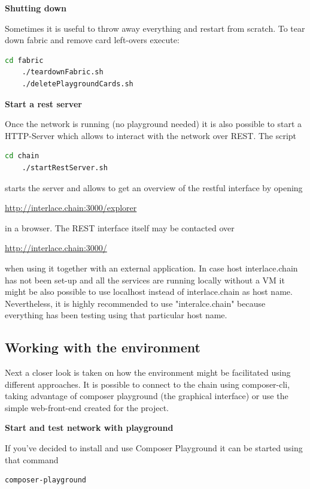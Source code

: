 \textbf{Shutting down}

Sometimes it is useful to throw away everything and restart from scratch. To tear down fabric and remove card left-overs execute:

\begin{lstlisting}[language=bash]
	cd fabric
	./teardownFabric.sh
	./deletePlaygroundCards.sh
\end{lstlisting}

\textbf{Start a rest server}

Once the network is running (no playground needed) it is also possible to start a HTTP-Server which allows to interact with the network over REST. The script

\begin{lstlisting}[language=bash]
	cd chain
	./startRestServer.sh
\end{lstlisting}

starts the server and allows to get an overview of the restful interface by opening

\url{http://interlace.chain:3000/explorer}

in a browser. The REST interface itself may be contacted over

\url{http://interlace.chain:3000/}

when using it together with an external application. In case host interlace.chain has not been set-up and all the services are running locally without a VM it might be also possible to use localhost instead of interlace.chain as host name. Nevertheless, it is highly recommended to use "interalce.chain" because everything has been testing using that particular host name.

\subsection{Working with the environment}

Next a closer look is taken on how the environment might be facilitated using different approaches. It is possible to connect to the chain using composer-cli, taking advantage of composer playground (the graphical interface) or use the simple web-front-end created for the project.

\textbf{Start and test network with playground}

If you've decided to install and use Composer Playground it can be started using that command

\begin{lstlisting}[language=bash]
	composer-playground
\end{lstlisting}


